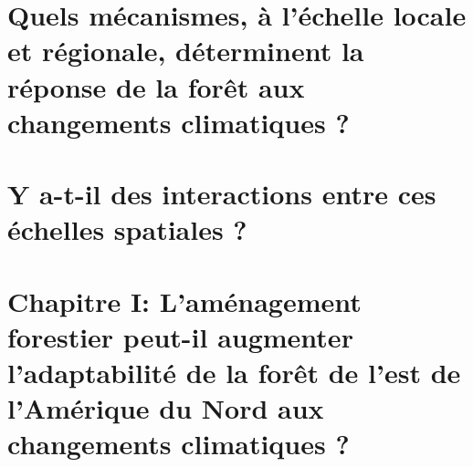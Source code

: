 \documentclass[11pt, compress, aspectratio=1610]{beamer}
\begin{document}
\section{\texorpdfstring{Quels mécanismes, à l'échelle locale et
régionale, déterminent la réponse de la forêt aux changements
\newline climatiques
?}{Quels mécanismes, à l'échelle locale et régionale, déterminent la réponse de la forêt aux changements climatiques ?}}\label{quels-muxe9canismes-uxe0-luxe9chelle-locale-et-ruxe9gionale-duxe9terminent-la-ruxe9ponse-de-la-foruxeat-aux-changements-climatiques}

\section{Y a-t-il des interactions entre ces échelles spatiales
?}\label{y-a-t-il-des-interactions-entre-ces-uxe9chelles-spatiales}

\section{\texorpdfstring{Chapitre I: \newline L'aménagement forestier
peut-il \newline augmenter l'adaptabilité de la forêt de l'est de
l'Amérique du Nord aux changements climatiques
?}{Chapitre I: L'aménagement forestier peut-il augmenter l'adaptabilité de la forêt de l'est de l'Amérique du Nord aux changements climatiques ?}}\label{chapitre-i-lamuxe9nagement-forestier-peut-il-augmenter-ladaptabilituxe9-de-la-foruxeat-de-lest-de-lamuxe9rique-du-nord-aux-changements-climatiques}
\end{document}
